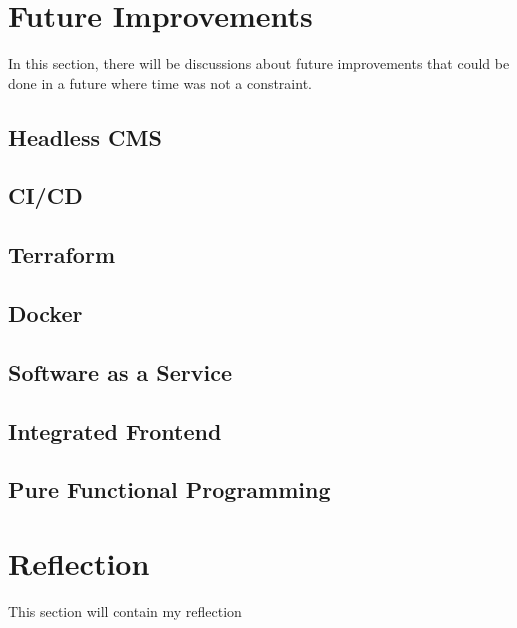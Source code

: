 \section{Future Improvements}
\label{s:Future-improvements}
In this section, there will be discussions about future improvements that could be
done in a future where time was not a constraint.

\subsection{Headless CMS}
\label{s:Headless-CMS}

\subsection{CI/CD}
\label{s:CI-CD}

\subsection{Terraform}
\label{s:Terraform}

\subsection{Docker}
\label{s:Docker}

\subsection{Software as a Service}
\label{s:SaaS}

\subsection{Integrated Frontend}
\label{s:Integrated-Frontend}

\subsection{Pure Functional Programming}
\label{s:Pure-Functional-Programming}


\section{Reflection}
\label{s:Reflection}
This section will contain my reflection

